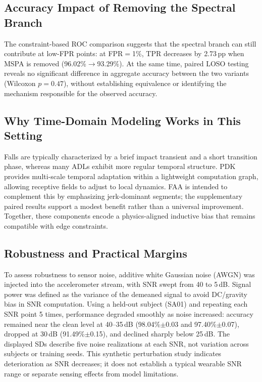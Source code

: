 \documentclass[jec]{acnsart}
\begin{document}
\subsection{Accuracy Impact of Removing the Spectral Branch}

The constraint-based ROC comparison suggests that the spectral branch can still contribute at low-FPR points: at FPR${=}$1\%, TPR decreases by 2.73\,pp when MSPA is removed (96.02\%${\rightarrow}$93.29\%). At the same time, paired LOSO testing reveals no significant difference in aggregate accuracy between the two variants (Wilcoxon $p{=}0.47$), without establishing equivalence or identifying the mechanism responsible for the observed accuracy.

\subsection{Why Time-Domain Modeling Works in This Setting}

Falls are typically characterized by a brief impact transient and a short transition phase, whereas many ADLs exhibit more regular temporal structure. PDK provides multi-scale temporal adaptation within a lightweight computation graph, allowing receptive fields to adjust to local dynamics. FAA is intended to complement this by emphasizing jerk-dominant segments; the supplementary paired results support a modest benefit rather than a universal improvement. Together, these components encode a physics-aligned inductive bias that remains compatible with edge constraints.

\subsection{Robustness and Practical Margins}

To assess robustness to sensor noise, additive white Gaussian noise (AWGN) was injected into the accelerometer stream, with SNR swept from 40 to 5\,dB. Signal power was defined as the variance of the demeaned signal to avoid DC/gravity bias in SNR computation. Using a held-out subject (SA01) and repeating each SNR point 5 times, performance degraded smoothly as noise increased: accuracy remained near the clean level at 40--35\,dB (98.04\%$\pm$0.03 and 97.40\%$\pm$0.07), dropped at 30\,dB (91.49\%$\pm$0.15), and declined sharply below 25\,dB. The displayed SDs describe five noise realizations at each SNR, not variation across subjects or training seeds. This synthetic perturbation study indicates deterioration as SNR decreases; it does not establish a typical wearable SNR range or separate sensing effects from model limitations.
\end{document}
